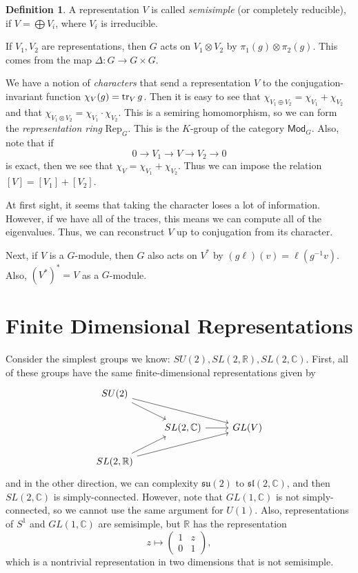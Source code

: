 \documentclass[leqno, openany]{memoir}
\theoremstyle{definition}
\newtheorem{defn}[thm]{Definition}
\theoremstyle{remark}
\theoremstyle{plain}
\theoremstyle{definition}
\theoremstyle{remark}
\newcommand{\R}{\mathbb{R}}
\newcommand{\C}{\mathbb{C}}
\newcommand{\mf}[1]{\mathfrak{#1}}
\newcommand{\mr}[1]{\mathrm{#1}}
\newcommand{\ms}[1]{\mathsf{#1}}
\begin{document}
\begin{defn}
    A representation $V$ is called \textit{semisimple} (or completely reducible), if $V = \bigoplus V_i$, where $V_i$ is irreducible. 
\end{defn}

If $V_1, V_2$ are representations, then $G$ acts on $V_1 \otimes V_2$ by $\pi_1(g) \otimes \pi_2(g)$. This comes from the map $\Delta \colon G \to G \times G$.

We have a notion of \textit{characters} that send a representation $V$ to the conjugation-invariant function $\chi_V(g) = \tr_V g$. Then it is easy to see that $\chi_{V_1 \oplus V_2} = \chi_{V_1} + \chi_{V_2}$ and that $\chi_{V_1 \otimes V_2} = \chi_{V_1} \cdot \chi_{V_2}$. This is a semiring homomorphism, so we can form the \textit{representation ring} $\mr{Rep}_G$. This is the $K$-group of the category $\ms{Mod}_G$. Also, note that if
\[ 0 \to V_1 \to V \to V_2 \to 0 \]
is exact, then we see that $\chi_V = \chi_{V_1} + \chi_{V_2}$. Thus we can impose the relation $[V] = [V_1] + [V_2]$.

At first sight, it seems that taking the character loses a lot of information. However, if we have all of the traces, this means we can compute all of the eigenvalues. Thus, we can reconstruct $V$ up to conjugation from its character.

Next, if $V$ is a $G$-module, then $G$ also acts on $V^*$ by $(g\ell)(v) = \ell(g^{-1} v)$. Also, $(V^*)^* = V$ as a $G$-module.

\section{Finite Dimensional Representations}%
\label{sec:finite_dimensional_representations}

Consider the simplest groups we know: $SU(2), SL(2, \R), SL(2, \C)$. First, all of these groups have the same finite-dimensional representations given by
\begin{equation*}
\begin{tikzcd}
    SU(2) \arrow{dr} \arrow{drr} \\
    & SL(2, \C) \arrow{r} & GL(V) \\
    SL(2, \R) \arrow{ur} \arrow{urr}
\end{tikzcd}
\end{equation*}
and in the other direction, we can complexity $\mf{su}(2)$ to $\mf{sl}(2, \C)$, and then $SL(2, \C)$ is simply-connected. However, note that $GL(1, \C)$ is not simply-connected, so we cannot use the same argument for $U(1)$. Also, representations of $S^1$ and $GL(1, \C)$ are semisimple, but $\R$ has the representation
\[ z \mapsto \begin{pmatrix}
    1 & z \\
    0 & 1
\end{pmatrix}, \]
which is a nontrivial representation in two dimensions that is not semisimple.
\end{document}
